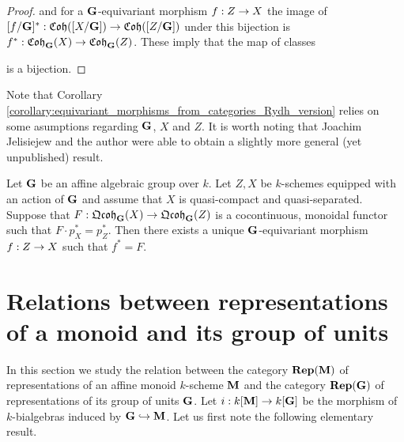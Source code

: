 \begin{proof}
and for a $\mathbf{G}$-equivariant morphism $f:Z\rightarrow X$ the image of $[f/\mathbf{G}]^*:\mathfrak{Coh}([X/\mathbf{G}])\rightarrow \mathfrak{Coh}([Z/\mathbf{G}])$ under this bijection is $f^*:\mathfrak{Coh}_{\mathbf{G}}(X)\rightarrow \mathfrak{Coh}_{\mathbf{G}}(Z)$. These imply that the map of classes
\begin{center}
\end{center}
is a bijection.
\end{proof}
\noindent
Note that Corollary \ref{corollary:equivariant_morphisms_from_categories_Rydh_version} relies on some asumptions regarding $\mathbf{G}$, $X$ and $Z$. It is worth noting that Joachim Jelisiejew and the author were able to obtain a slightly more general (yet unpublished) result.

\begin{theorem}\label{theorem:equivariant_morphisms_from_categories_Jelisiejew_et_al_version}
Let $\mathbf{G}$ be an affine algebraic group over $k$. Let $Z,X$ be $k$-schemes equipped with an action of $\mathbf{G}$ and assume that $X$ is quasi-compact and quasi-separated. Suppose that $F:\mathfrak{Qcoh}_{\mathbf{G}}(X)\rightarrow \mathfrak{Qcoh}_{\mathbf{G}}(Z)$ is a cocontinuous, monoidal functor such that $F\cdot p_X^* = p_Z^*$. Then there exists a unique $\mathbf{G}$-equivariant morphism $f:Z\rightarrow X$ such that $f^* = F$.
\end{theorem}

\section{Relations between representations of a monoid and its group of units}
\noindent
In this section we study the relation between the category $\mathbf{Rep}(\mathbf{M})$ of representations of an affine monoid $k$-scheme $\mathbf{M}$ and the category $\mathbf{Rep}(\mathbf{G})$ of representations of its group of units $\mathbf{G}$. Let $i:k[\mathbf{M}]\rightarrow k[\mathbf{G}]$ be the morphism of $k$-bialgebras induced by $\mathbf{G}\hookrightarrow \mathbf{M}$. Let us first note the following elementary result.

